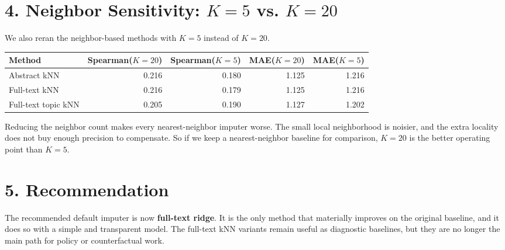 \documentclass[11pt]{article}
\begin{document}
\section*{4. Neighbor Sensitivity: $K=5$ vs. $K=20$}
We also reran the neighbor-based methods with $K=5$ instead of $K=20$.

\begin{center}
\small
\begin{tabular}{>{\raggedright}p{4.0cm}rrrr}
\toprule
Method & Spearman($K=20$) & Spearman($K=5$) & MAE($K=20$) & MAE($K=5$) \\
\midrule
Abstract kNN & 0.216 & 0.180 & 1.125 & 1.216 \\
Full-text kNN & 0.216 & 0.179 & 1.125 & 1.216 \\
Full-text topic kNN & 0.205 & 0.190 & 1.127 & 1.202 \\
\bottomrule
\end{tabular}
\end{center}

Reducing the neighbor count makes every nearest-neighbor imputer worse. The
small local neighborhood is noisier, and the extra locality does not buy enough
precision to compensate. So if we keep a nearest-neighbor baseline for
comparison, $K=20$ is the better operating point than $K=5$.

\section*{5. Recommendation}
The recommended default imputer is now \textbf{full-text ridge}. It is the only
method that materially improves on the original baseline, and it does so with a
simple and transparent model. The full-text kNN variants remain useful as
diagnostic baselines, but they are no longer the main path for policy or
counterfactual work.
\end{document}
